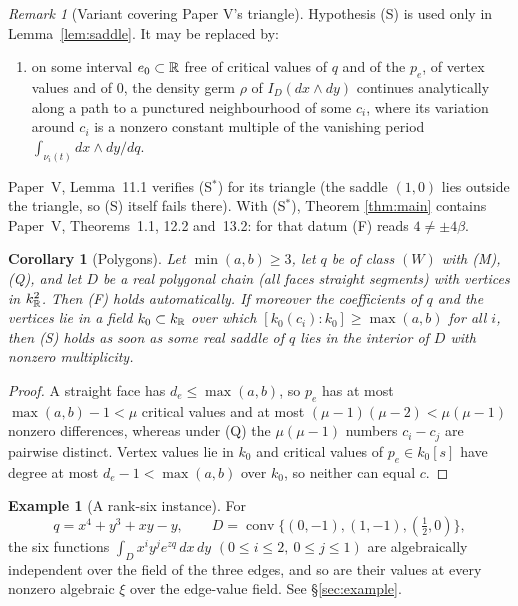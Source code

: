 \documentclass[11pt]{article}
\numberwithin{equation}{section}
\newtheorem{corollary}[theorem]{Corollary}
\theoremstyle{definition}
\newtheorem{example}[theorem]{Example}
\theoremstyle{remark}
\newtheorem{remark}[theorem]{Remark}
\newcommand{\dd}{\,d}
\begin{document}
\begin{remark}[Variant covering Paper V's triangle]\label{rem:Sstar}
Hypothesis (S) is used only in Lemma~\ref{lem:saddle}. It may be replaced by:
\begin{enumerate}[leftmargin=2.6em]
\item[(S$^*$)] on some interval $e_0\subset\mathbb R$ free of critical values of $q$
 and of the $p_e$, of vertex values and of $0$, the density germ $\rho$ of
 $I_D(dx\wedge dy)$ continues analytically along a path to a punctured
 neighbourhood of some $c_i$, where its variation around $c_i$ is a nonzero
 constant multiple of the vanishing period $\int_{\nu_i(t)}dx\wedge dy/dq$.
\end{enumerate}
Paper~V, Lemma~11.1 verifies (S$^*$) for its triangle (the saddle $(1,0)$ lies
outside the triangle, so (S) itself fails there). With (S$^*$), Theorem
\ref{thm:main} contains Paper~V, Theorems~1.1, 12.2 and~13.2: for that datum (F)
reads $4\ne\pm4\beta$.
\end{remark}

\begin{corollary}[Polygons]\label{cor:polygon}
Let $\min(a,b)\ge3$, let $q$ be of class $(W)$ with \textup{(M)}, \textup{(Q)},
and let $D$ be a real polygonal chain (all faces straight segments) with vertices
in $k_\mathbb R^2$. Then \textup{(F)} holds automatically. If moreover the coefficients
of $q$ and the vertices lie in a field $k_0\subset k_\mathbb R$ over which
$[k_0(c_i):k_0]\ge\max(a,b)$ for all $i$, then \textup{(S)} holds as soon as some
real saddle of $q$ lies in the interior of $D$ with nonzero multiplicity.
\end{corollary}
\begin{proof}
A straight face has $d_e\le\max(a,b)$, so $p_e$ has at most $\max(a,b)-1<\mu$
critical values and at most $(\mu-1)(\mu-2)<\mu(\mu-1)$ nonzero differences,
whereas under (Q) the $\mu(\mu-1)$ numbers $c_i-c_j$ are pairwise distinct.
Vertex values lie in $k_0$ and critical values of $p_e\in k_0[s]$ have degree at
most $d_e-1<\max(a,b)$ over $k_0$, so neither can equal $c$.
\end{proof}

\begin{example}[A rank-six instance]\label{ex:intro}
For
\[
 q=x^4+y^3+xy-y,\qquad D=\operatorname{conv}\{(0,-1),(1,-1),(\tfrac12,0)\},
\]
the six functions $\int_D x^iy^je^{zq}\dd x\dd y$ $(0\le i\le2,\ 0\le j\le1)$ are
algebraically independent over the field of the three edges, and so are their
values at every nonzero algebraic $\xi$ over the edge-value field. See
\S\ref{sec:example}.
\end{example}
\end{document}

